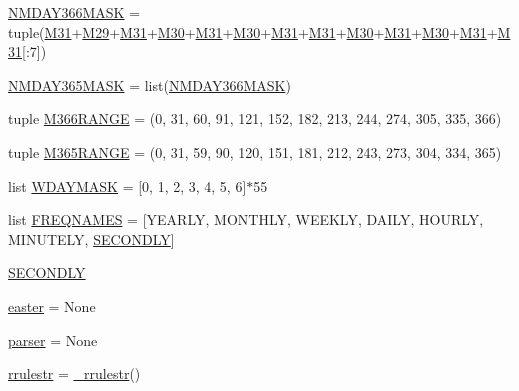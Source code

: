 \begin{DoxyCompactItemize}
\hyperlink{namespacedateutil_1_1rrule_a4cc810f7b1aaecbbe9d7dc27778d7d65}{N\+M\+D\+A\+Y366\+M\+A\+SK} = tuple(\hyperlink{namespacedateutil_1_1rrule_aff88a8ca05b8ccefded35b249ead0c6e}{M31}+\hyperlink{namespacedateutil_1_1rrule_aa48d0a3018e00f60591bac3321202fc6}{M29}+\hyperlink{namespacedateutil_1_1rrule_aff88a8ca05b8ccefded35b249ead0c6e}{M31}+\hyperlink{namespacedateutil_1_1rrule_a21e1626326f7f257e5d2e4a7195af9ba}{M30}+\hyperlink{namespacedateutil_1_1rrule_aff88a8ca05b8ccefded35b249ead0c6e}{M31}+\hyperlink{namespacedateutil_1_1rrule_a21e1626326f7f257e5d2e4a7195af9ba}{M30}+\hyperlink{namespacedateutil_1_1rrule_aff88a8ca05b8ccefded35b249ead0c6e}{M31}+\hyperlink{namespacedateutil_1_1rrule_aff88a8ca05b8ccefded35b249ead0c6e}{M31}+\hyperlink{namespacedateutil_1_1rrule_a21e1626326f7f257e5d2e4a7195af9ba}{M30}+\hyperlink{namespacedateutil_1_1rrule_aff88a8ca05b8ccefded35b249ead0c6e}{M31}+\hyperlink{namespacedateutil_1_1rrule_a21e1626326f7f257e5d2e4a7195af9ba}{M30}+\hyperlink{namespacedateutil_1_1rrule_aff88a8ca05b8ccefded35b249ead0c6e}{M31}+\hyperlink{namespacedateutil_1_1rrule_aff88a8ca05b8ccefded35b249ead0c6e}{M31}\mbox{[}\+:7\mbox{]})
\item 
\hyperlink{namespacedateutil_1_1rrule_ae6ac84468532b70d2311c2f3001379e9}{N\+M\+D\+A\+Y365\+M\+A\+SK} = list(\hyperlink{namespacedateutil_1_1rrule_a4cc810f7b1aaecbbe9d7dc27778d7d65}{N\+M\+D\+A\+Y366\+M\+A\+SK})
\item 
tuple \hyperlink{namespacedateutil_1_1rrule_aa10ab73118e4d70a9b52f98057a0a024}{M366\+R\+A\+N\+GE} = (0, 31, 60, 91, 121, 152, 182, 213, 244, 274, 305, 335, 366)
\item 
tuple \hyperlink{namespacedateutil_1_1rrule_ad179a90af3cd58f9abb866b0c7fc5225}{M365\+R\+A\+N\+GE} = (0, 31, 59, 90, 120, 151, 181, 212, 243, 273, 304, 334, 365)
\item 
list \hyperlink{namespacedateutil_1_1rrule_a5a16576aa125d6c19008f83b9ad1c701}{W\+D\+A\+Y\+M\+A\+SK} = \mbox{[}0, 1, 2, 3, 4, 5, 6\mbox{]}$\ast$55
\item 
list \hyperlink{namespacedateutil_1_1rrule_a71d4c542c4e5d7c5efe5c45ddfa5a46a}{F\+R\+E\+Q\+N\+A\+M\+ES} = \mbox{[}\textquotesingle{}Y\+E\+A\+R\+LY\textquotesingle{}, \textquotesingle{}M\+O\+N\+T\+H\+LY\textquotesingle{}, \textquotesingle{}W\+E\+E\+K\+LY\textquotesingle{}, \textquotesingle{}D\+A\+I\+LY\textquotesingle{}, \textquotesingle{}H\+O\+U\+R\+LY\textquotesingle{}, \textquotesingle{}M\+I\+N\+U\+T\+E\+LY\textquotesingle{}, \textquotesingle{}\hyperlink{namespacedateutil_1_1rrule_a7073585389eeb2a8f6b0775ec3a69795}{S\+E\+C\+O\+N\+D\+LY}\textquotesingle{}\mbox{]}
\item 
\hyperlink{namespacedateutil_1_1rrule_a7073585389eeb2a8f6b0775ec3a69795}{S\+E\+C\+O\+N\+D\+LY}
\item 
\hyperlink{namespacedateutil_1_1rrule_aec564bea5167dcc2ef0b0cf7555e0469}{easter} = None
\item 
\hyperlink{namespacedateutil_1_1rrule_a6fad102cafe956f4cf9b3e17c0ff78bb}{parser} = None
\item 
\hyperlink{namespacedateutil_1_1rrule_a833e9e6e7b3e4c65b3e740eef460d9f5}{rrulestr} = \hyperlink{classdateutil_1_1rrule_1_1__rrulestr}{\+\_\+rrulestr}()
\end{DoxyCompactItemize}


